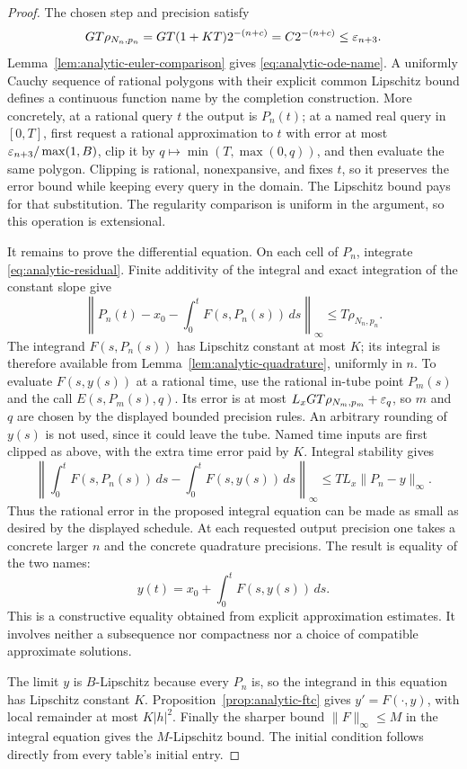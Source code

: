 \begin{proof}
The chosen step and precision satisfy
\[
 GT\rho_{N_n,p_n}
 =GT(1+KT)2^{-(n+c)}=C2^{-(n+c)}\le\varepsilon_{n+3}.
\]
Lemma~\ref{lem:analytic-euler-comparison} gives \eqref{eq:analytic-ode-name}.  A uniformly Cauchy sequence of rational polygons with their explicit common Lipschitz bound defines a continuous function name by the completion construction.  More concretely, at a rational query $t$ the output is $P_n(t)$; at a named real query in $[0,T]$, first request a rational approximation to $t$ with error at most $\varepsilon_{n+3}/\max(1,B)$, clip it by $q\mapsto\min(T,\max(0,q))$, and then evaluate the same polygon.  Clipping is rational, nonexpansive, and fixes $t$, so it preserves the error bound while keeping every query in the domain.  The Lipschitz bound pays for that substitution.  The regularity comparison is uniform in the argument, so this operation is extensional.

It remains to prove the differential equation.  On each cell of $P_n$, integrate \eqref{eq:analytic-residual}.  Finite additivity of the integral and exact integration of the constant slope give
\[
 \left\|P_n(t)-x_0-\int_0^tF(s,P_n(s))\,ds\right\|_\infty
 \le T\rho_{N_n,p_n}.
\]
The integrand $F(s,P_n(s))$ has Lipschitz constant at most $K$; its integral is therefore available from Lemma~\ref{lem:analytic-quadrature}, uniformly in $n$.  To evaluate $F(s,y(s))$ at a rational time, use the rational in-tube point $P_m(s)$ and the call $E(s,P_m(s),q)$.  Its error is at most $L_xGT\rho_{N_m,p_m}+\varepsilon_q$, so $m$ and $q$ are chosen by the displayed bounded precision rules.  An arbitrary rounding of $y(s)$ is not used, since it could leave the tube.  Named time inputs are first clipped as above, with the extra time error paid by $K$.  Integral stability gives
\[
 \left\|\int_0^tF(s,P_n(s))\,ds-
             \int_0^tF(s,y(s))\,ds\right\|_\infty
 \le TL_x\|P_n-y\|_\infty.
\]
Thus the rational error in the proposed integral equation can be made as small as desired by the displayed schedule.  At each requested output precision one takes a concrete larger $n$ and the concrete quadrature precisions.  The result is equality of the two names:
\[
 y(t)=x_0+\int_0^tF(s,y(s))\,ds.
\]
This is a constructive equality obtained from explicit approximation estimates.  It involves neither a subsequence nor compactness nor a choice of compatible approximate solutions.

The limit $y$ is $B$-Lipschitz because every $P_n$ is, so the integrand in this equation has Lipschitz constant $K$.  Proposition~\ref{prop:analytic-ftc} gives $y'=F(\cdot,y)$, with local remainder at most $K|h|^2$.  Finally the sharper bound $\|F\|_\infty\le M$ in the integral equation gives the $M$-Lipschitz bound.  The initial condition follows directly from every table's initial entry.


\end{proof}
